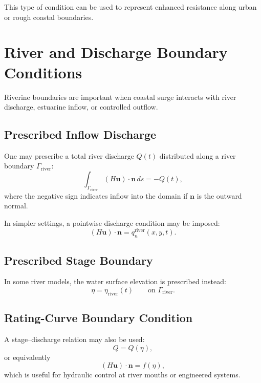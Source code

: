 \documentclass[11pt]{article}
\begin{document}
This type of condition can be used to represent enhanced resistance along urban or rough coastal boundaries.

\section{River and Discharge Boundary Conditions}

Riverine boundaries are important when coastal surge interacts with river discharge, estuarine inflow, or controlled outflow.

\subsection{Prescribed Inflow Discharge}

One may prescribe a total river discharge \(Q(t)\) distributed along a river boundary \(\Gamma_{\mathrm{river}}\):
\begin{equation}
\int_{\Gamma_{\mathrm{river}}} (H\bm{u})\cdot\bm{n}\, ds = -Q(t),
\end{equation}
where the negative sign indicates inflow into the domain if \(\bm{n}\) is the outward normal.

In simpler settings, a pointwise discharge condition may be imposed:
\begin{equation}
(H\bm{u})\cdot\bm{n} = q_n^{\mathrm{river}}(x,y,t).
\end{equation}

\subsection{Prescribed Stage Boundary}

In some river models, the water surface elevation is prescribed instead:
\begin{equation}
\eta = \eta_{\mathrm{river}}(t)
\qquad \text{on } \Gamma_{\mathrm{river}}.
\end{equation}

\subsection{Rating-Curve Boundary Condition}

A stage--discharge relation may also be used:
\begin{equation}
Q = Q(\eta),
\end{equation}
or equivalently
\begin{equation}
(H\bm{u})\cdot\bm{n} = f(\eta),
\end{equation}
which is useful for hydraulic control at river mouths or engineered systems.
\end{document}
